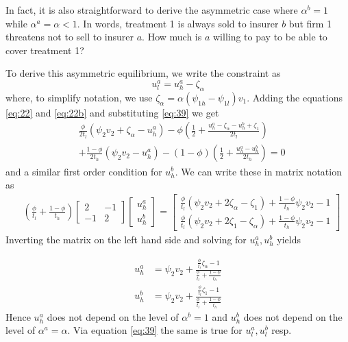 \documentclass[a4paper,12pt]{article}
\begin{document}
In fact, it is also straightforward to derive the asymmetric case where \(\alpha^b =1\) while \(\alpha^a = \alpha <1\). In words, treatment 1 is always sold to insurer \(b\) but firm 1 threatens not to sell to insurer \(a\). How much is \(a\) willing to pay to be able to cover treatment 1?

To derive this asymmetric equilibrium, we write the constraint as
\begin{equation}
\label{eq:39}
u_l^a = u_h^a - \zeta_{\alpha}
\end{equation}
where, to simplify notation, we use \(\zeta_{\alpha}=\alpha (\psi_{1h}-\psi_{1l})v_1\).
Adding the equations \eqref{eq:22} and \eqref{eq:22b} and substituting \eqref{eq:39} we get
\begin{equation}
\label{eq:40}
\begin{split}
&\frac{\phi}{2t_l}(\psi_2 v_2 + \zeta_{\alpha} - u_h^a) - \phi(\frac{1}{2} + \frac{u_h^a - \zeta_{\alpha} - u_h^b + \zeta_1}{2t_l} ) \\
&+\frac{1-\phi}{2t_h} (\psi_2 v_2 - u_h^a) - (1-\phi) (\frac{1}{2} + \frac{u_h^a - u_h^b}{2t_h} )   =0
\end{split}
\end{equation}
and a similar first order condition for \(u_h^b\). We can write these in matrix notation as
\begin{equation}
\label{eq:41}
\begin{split}
& (\frac{\phi}{t_l} + \frac{1-\phi}{t_h})
\begin{bmatrix}
2 & -1 \\
-1&  2
\end{bmatrix}
\begin{bmatrix}
u_h^a \\
u_h^b
\end{bmatrix}
=
\begin{bmatrix}
\frac{\phi}{t_l}(\psi_2 v_2 + 2 \zeta_{\alpha} - \zeta_1) + \frac{1-\phi}{t_h}\psi_2 v_2 -1 \\
\frac{\phi}{t_l}(\psi_2 v_2 + 2 \zeta_{1} - \zeta_\alpha) + \frac{1-\phi}{t_h}\psi_2 v_2 -1
\end{bmatrix}
\end{split}
\end{equation}
Inverting the matrix on the left hand side and solving for \(u_h^a,u_h^b\) yields

\begin{align}
\label{eq:47}
u_h^a &= \psi_2 v_2 + \frac{\frac{\phi}{t_l} \zeta_{\alpha} -1}{\frac{\phi}{t_l}+\frac{1-\phi}{t_h}} \\
\label{eq:47b}
u_h^b &= \psi_2 v_2 + \frac{\frac{\phi}{t_l} \zeta_{1} -1}{\frac{\phi}{t_l}+\frac{1-\phi}{t_h}}
\end{align}
Hence \(u_h^a\) does not depend on the level of \(\alpha^b =1\) and \(u_h^b\) does not depend on the level of \(\alpha^a =\alpha\). Via equation \eqref{eq:39} the same is true for \(u_l^a,u_l^b\) resp.
\end{document}
